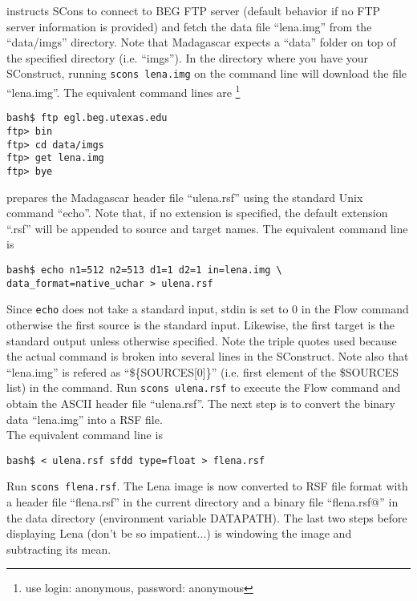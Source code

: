 
%
instructs SCons to connect to BEG FTP server (default behavior if no
FTP server information is provided) and fetch the data file
``lena.img'' from the ``data/imgs'' directory. Note that Madagascar
expects a ``data'' folder on top of the specified directory (i.e.
``imgs''). In the directory where you have your SConstruct, running
\texttt{scons lena.img} on the command line will download the file
``lena.img''.  The equivalent command lines are \footnote{use login:
  anonymous, password: anonymous}
\begin{verbatim}
bash$ ftp egl.beg.utexas.edu
ftp> bin
ftp> cd data/imgs
ftp> get lena.img
ftp> bye
\end{verbatim}
%

%
prepares the Madagascar header file ``ulena.rsf'' using the standard
Unix command ``echo''. Note that, if no extension is specified, the
default extension ``.rsf'' will be appended to source and target
names. The equivalent command line is
%
\begin{verbatim}
bash$ echo n1=512 n2=513 d1=1 d2=1 in=lena.img \
data_format=native_uchar > ulena.rsf
\end{verbatim}
%
Since \texttt{echo} does not take a standard input, stdin is set to 0
in the Flow command otherwise the first source is the standard input.
Likewise, the first target is the standard output unless otherwise
specified. Note the triple quotes used because the actual command is
broken into several lines in the SConstruct. Note also that
``lena.img'' is refered as ``\$\{SOURCES[0]\}'' (i.e.  first element
of the \$SOURCES list) in the command. Run \texttt{scons ulena.rsf} to
execute the Flow command and obtain the ASCII header file
``ulena.rsf''.  The next step is to convert the
binary data ``lena.img'' into a RSF file.\\


%
The equivalent command line is
%
\begin{verbatim}
bash$ < ulena.rsf sfdd type=float > flena.rsf
\end{verbatim}
%
Run \texttt{scons flena.rsf}. The Lena image is now converted to RSF
file format with a header file ``flena.rsf'' in the current directory
and a binary file ``flena.rsf@'' in the data directory (environment
variable DATAPATH). The last two steps before displaying Lena (don't
be so impatient...)  is windowing the image and subtracting its mean.\\


